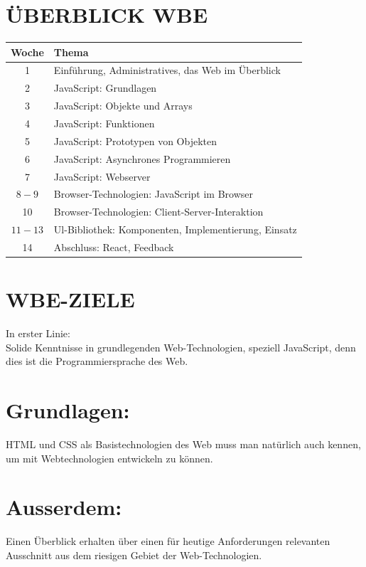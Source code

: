 \documentclass[10pt]{article}
\begin{document}
\section*{ÜBERBLICK WBE}
\begin{center}
\begin{tabular}{|c|l|}
\hline
Woche & Thema \\
\hline
1 & Einführung, Administratives, das Web im Überblick \\
\hline
2 & JavaScript: Grundlagen \\
\hline
3 & JavaScript: Objekte und Arrays \\
\hline
4 & JavaScript: Funktionen \\
\hline
5 & JavaScript: Prototypen von Objekten \\
\hline
6 & JavaScript: Asynchrones Programmieren \\
\hline
7 & JavaScript: Webserver \\
\hline
$8-9$ & Browser-Technologien: JavaScript im Browser \\
\hline
10 & Browser-Technologien: Client-Server-Interaktion \\
\hline
$11-13$ & Ul-Bibliothek: Komponenten, Implementierung, Einsatz \\
\hline
14 & Abschluss: React, Feedback \\
\hline
\end{tabular}
\end{center}

\section*{WBE-ZIELE}
In erster Linie:\\
Solide Kenntnisse in grundlegenden Web-Technologien, speziell JavaScript, denn dies ist die Programmiersprache des Web.

\section*{Grundlagen:}
HTML und CSS als Basistechnologien des Web muss man natürlich auch kennen, um mit Webtechnologien entwickeln zu können.

\section*{Ausserdem:}
Einen Überblick erhalten über einen für heutige Anforderungen relevanten Ausschnitt aus dem riesigen Gebiet der Web-Technologien.
\end{document}
